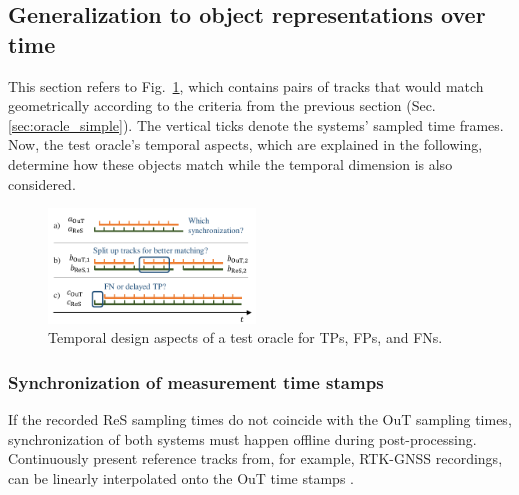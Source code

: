 \documentclass[conference]{IEEEtran}
\begin{document}
\subsection{Generalization to object representations over time}
\label{sec:oracle_time}


This section refers to Fig.~\ref{fig:timeline}, which contains pairs of tracks that would match geometrically according to the criteria from the previous section (Sec. \ref{sec:oracle_simple}). 
The vertical ticks denote the systems' sampled time frames.
Now, the test oracle's temporal aspects, which are explained in the following, determine how these objects match while the temporal dimension is also considered.



\begin{figure}[t]
	\centering
	\vspace*{2mm}
	\includegraphics[width=0.49\textwidth]{img/timeline.pdf}
	\caption{Temporal design aspects of a test oracle for TPs, FPs, and FNs.
	}
	\label{fig:timeline}
\end{figure}



\subsubsection{Synchronization of measurement time stamps}
\label{sec:temp_sync}

If the recorded ReS sampling times do not coincide with the OuT sampling times, synchronization of both systems must happen offline during post-processing. %
Continuously present reference tracks from, for example, RTK-GNSS recordings, can be linearly interpolated onto the OuT time stamps \cite[Sec. 10.2.7]{Brahmi2020diss}.
\end{document}
